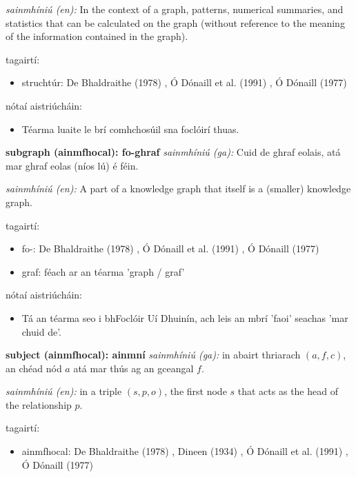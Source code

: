 \documentclass{article}
\begin{document}
\textit{sainmhíniú (en):} In the context of a graph, patterns, numerical summaries, and statistics that can be calculated on the graph (without reference to the meaning of the information contained in the graph).

tagairtí:
\begin{itemize}
	\item struchtúr: De Bhaldraithe (1978) \cite{de-bhaldraithe}, Ó Dónaill et al. (1991) \cite{focloir-beag}, Ó Dónaill (1977) \cite{odonaill}
\end{itemize}

nótaí aistriúcháin:
\begin{itemize}
	\item Téarma luaite le brí comhchosúil sna foclóirí thuas.
\end{itemize}


\textbf{subgraph (ainmfhocal): fo-ghraf}
\textit{sainmhíniú (ga):} Cuid de ghraf eolais, atá mar ghraf eolas (níos lú) é féin.

\textit{sainmhíniú (en):} A part of a knowledge graph that itself is a (smaller) knowledge graph.

tagairtí:
\begin{itemize}
	\item fo-: De Bhaldraithe (1978) \cite{de-bhaldraithe}, Ó Dónaill et al. (1991) \cite{focloir-beag}, Ó Dónaill (1977) \cite{odonaill}
	\item graf: féach ar an téarma 'graph / graf'
\end{itemize}

nótaí aistriúcháin:
\begin{itemize}
	\item Tá an téarma seo i bhFoclóir Uí Dhuinín, ach leis an mbrí 'faoi' seachas 'mar chuid de'.
\end{itemize}


\textbf{subject (ainmfhocal): ainmní}
\textit{sainmhíniú (ga):} in abairt thriarach $(a,f,c)$, an chéad nód $a$ atá mar thús ag an gceangal $f$.

\textit{sainmhíniú (en):} in a triple $(s,p,o)$, the first node $s$ that acts as the head of the relationship $p$.

tagairtí:
\begin{itemize}
	\item ainmfhocal: De Bhaldraithe (1978) \cite{de-bhaldraithe}, Dineen (1934) \cite{dineen}, Ó Dónaill et al. (1991) \cite{focloir-beag}, Ó Dónaill (1977) \cite{odonaill}
\end{itemize}
\end{document}
